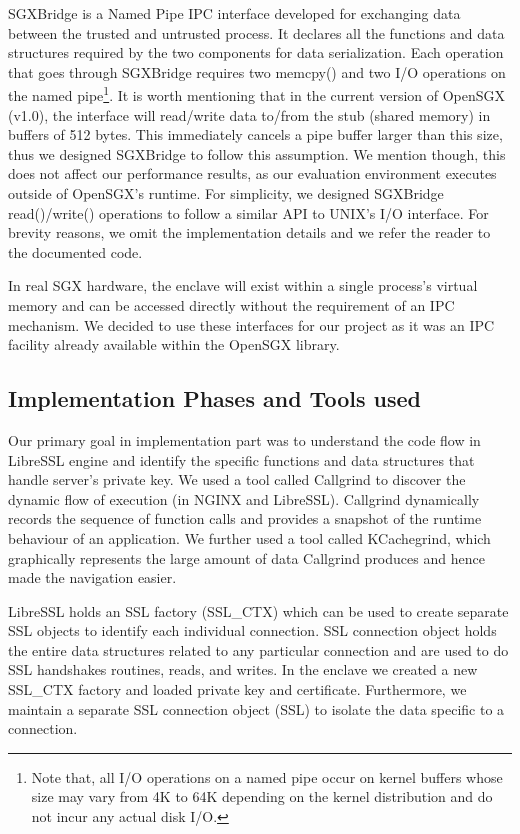 \documentclass[../main.tex]{subfiles}
\begin{document}
SGXBridge is a Named Pipe IPC interface developed for exchanging data between
the trusted and untrusted process. It declares all the functions and data
structures required by the two components for data serialization. Each operation
that goes through SGXBridge requires two memcpy() and two I/O operations on the
named pipe\footnote{Note that, all I/O operations on a named pipe occur on
kernel buffers whose size may vary from 4K to 64K depending on the kernel
distribution and do not incur any actual disk I/O.}. It is worth mentioning
that in the current version of OpenSGX (v1.0), the interface will read/write
data to/from the stub (shared memory) in buffers of 512 bytes. This immediately
cancels a pipe buffer larger than this size, thus we designed SGXBridge to
follow this assumption. We mention though, this does not affect our performance
results, as our evaluation environment executes outside of OpenSGX's
runtime. For simplicity, we designed SGXBridge read()/write() operations to
follow a similar API to UNIX's I/O interface. For brevity reasons, we omit the
implementation details and we refer the reader to the documented code.

In real SGX hardware, the enclave will exist within a single process's virtual
memory and can be accessed directly without the requirement of an IPC
mechanism. We decided to use these interfaces for our project as it was an IPC
facility already available within the OpenSGX library.

\subsection{Implementation Phases and Tools used}
Our primary goal in implementation part was to understand the code flow in
LibreSSL engine and identify the specific functions and data structures that
handle server's private key. We used a tool called Callgrind to discover the
dynamic flow of execution (in NGINX and LibreSSL). Callgrind dynamically
records the sequence of function calls and provides a snapshot of the runtime
behaviour of an application. We further used a tool called KCachegrind, which
graphically represents the large amount of data Callgrind produces and hence
made the navigation easier.
 
LibreSSL holds an SSL factory (SSL\_CTX) which can be used to create separate
SSL objects to identify each individual connection. SSL connection object
holds the entire data structures related to any particular connection and are
used to do SSL handshakes routines, reads, and writes. In the enclave we
created a new SSL\_CTX factory and loaded private key and certificate.
Furthermore, we maintain a separate SSL connection object (SSL) to isolate the
data specific to a connection.   
 
\end{document}
